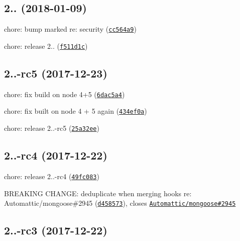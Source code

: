 \label{_2.0.0}%
 \subsection*{2.. (2018-\/01-\/09)}


\begin{DoxyItemize}
\item chore\+: bump marked re\+: security (\href{https://github.com/vkarpov15/kareem/commit/cc564a9}{\tt cc564a9})
\item chore\+: release 2.. (\href{https://github.com/vkarpov15/kareem/commit/f511d1c}{\tt f511d1c})
\end{DoxyItemize}

\label{_2.0.0-rc5}%
 \subsection*{2..-\/rc5 (2017-\/12-\/23)}


\begin{DoxyItemize}
\item chore\+: fix build on node 4+5 (\href{https://github.com/vkarpov15/kareem/commit/6dac5a4}{\tt 6dac5a4})
\item chore\+: fix built on node 4 + 5 again (\href{https://github.com/vkarpov15/kareem/commit/434ef0a}{\tt 434ef0a})
\item chore\+: release 2..-\/rc5 (\href{https://github.com/vkarpov15/kareem/commit/25a32ee}{\tt 25a32ee})
\end{DoxyItemize}

\label{_2.0.0-rc4}%
 \subsection*{2..-\/rc4 (2017-\/12-\/22)}


\begin{DoxyItemize}
\item chore\+: release 2..-\/rc4 (\href{https://github.com/vkarpov15/kareem/commit/49fc083}{\tt 49fc083})
\item B\+R\+E\+A\+K\+I\+NG C\+H\+A\+N\+GE\+: deduplicate when merging hooks re\+: Automattic/mongoose\#2945 (\href{https://github.com/vkarpov15/kareem/commit/d458573}{\tt d458573}), closes \href{https://github.com/Automattic/mongoose/issues/2945}{\tt Automattic/mongoose\#2945}
\end{DoxyItemize}

\label{_2.0.0-rc3}%
 \subsection*{2..-\/rc3 (2017-\/12-\/22)}


